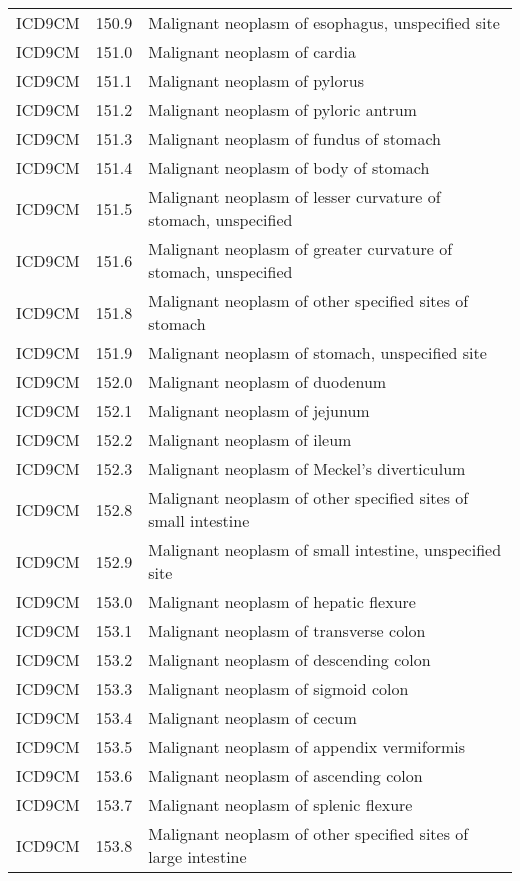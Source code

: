 \begin{longtable}{p{}p{}p{}}
  ICD9CM & 150.9 & Malignant neoplasm of esophagus, unspecified site \\ 
  ICD9CM & 151.0 & Malignant neoplasm of cardia \\ 
  ICD9CM & 151.1 & Malignant neoplasm of pylorus \\ 
  ICD9CM & 151.2 & Malignant neoplasm of pyloric antrum \\ 
  ICD9CM & 151.3 & Malignant neoplasm of fundus of stomach \\ 
  ICD9CM & 151.4 & Malignant neoplasm of body of stomach \\ 
  ICD9CM & 151.5 & Malignant neoplasm of lesser curvature of stomach, unspecified \\ 
  ICD9CM & 151.6 & Malignant neoplasm of greater curvature of stomach, unspecified \\ 
  ICD9CM & 151.8 & Malignant neoplasm of other specified sites of stomach \\ 
  ICD9CM & 151.9 & Malignant neoplasm of stomach, unspecified site \\ 
  ICD9CM & 152.0 & Malignant neoplasm of duodenum \\ 
  ICD9CM & 152.1 & Malignant neoplasm of jejunum \\ 
  ICD9CM & 152.2 & Malignant neoplasm of ileum \\ 
  ICD9CM & 152.3 & Malignant neoplasm of Meckel's diverticulum \\ 
  ICD9CM & 152.8 & Malignant neoplasm of other specified sites of small intestine \\ 
  ICD9CM & 152.9 & Malignant neoplasm of small intestine, unspecified site \\ 
  ICD9CM & 153.0 & Malignant neoplasm of hepatic flexure \\ 
  ICD9CM & 153.1 & Malignant neoplasm of transverse colon \\ 
  ICD9CM & 153.2 & Malignant neoplasm of descending colon \\ 
  ICD9CM & 153.3 & Malignant neoplasm of sigmoid colon \\ 
  ICD9CM & 153.4 & Malignant neoplasm of cecum \\ 
  ICD9CM & 153.5 & Malignant neoplasm of appendix vermiformis \\ 
  ICD9CM & 153.6 & Malignant neoplasm of ascending colon \\ 
  ICD9CM & 153.7 & Malignant neoplasm of splenic flexure \\ 
  ICD9CM & 153.8 & Malignant neoplasm of other specified sites of large intestine \\ 

\end{longtable}
